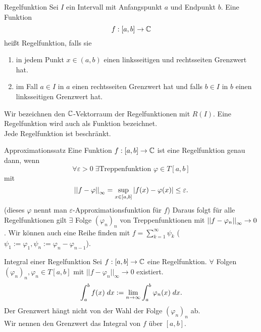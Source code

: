 \documentclass[main.tex]{subfiles}
\begin{document}
\begin{karte}{Regelfunktion}
    Sei \( I \) ein Intervall mit Anfangspunkt \(a\) 
    und Endpunkt \(b\). Eine Funktion 
    \[ \abb{f}{[a,b]}{\C} \] 
    heißt Regelfunktion, falls sie 
    \begin{enumerate}
        \item in jedem Punkt \(x \in (a,b)\) 
        einen linksseitigen und rechtsseiten 
        Grenzwert hat.
        
        \item im Fall \( a \in I \) in \(a\) einen 
        rechtsseiten Grenzwert hat und falls 
        \( b \in I \) in \(b\) 
        einen linksseitigen Grenzwert hat.
    \end{enumerate}
    Wir bezeichnen den \( \C \)-Vektorraum der 
    Regelfunktionen mit \( R(I) \).
    Eine Regelfunktion wird auch als  Funktion bezeichnet.\\
    Jede Regelfunktion ist beschränkt.
\end{karte}

\begin{karte}{Approximationssatz}
    Eine Funktion \( \abb{f}{[a,b]}{\C} \) ist 
    eine Regelfunktion genau dann, wenn 
    \[ \forall \varepsilon > 0 \; \exists 
    \text{Treppenfunktion } \varphi \in T[a,b] \]
    mit 
    \[ \norm{f - \varphi}_\infty 
    = \underset{x \in [a,b]}{\sup} \abs{f(x) - \varphi(x)}
    \leq \varepsilon. \]
    (dieses \(\varphi\) nennt man \( \varepsilon \)-Approximationsfunktion
    für \(f\))
    Daraus folgt für alle Regelfunktionen gilt 
    \( \exists \) Folge \( (\varphi_n)_n \) von Treppenfunktionen 
    mit \( \norm{f - \varphi_n}_\infty \rightarrow 0 \). 
    Wir können auch eine Reihe finden mit \( f = \sum_{k=1}^\infty \psi_k \) 
    (\( \psi_1 := \varphi_1, \psi_n := \varphi_n - \varphi_{n-1} \)).
\end{karte}

\begin{karte}{Integral einer Regelfunktion}
    Sei \( \abb{f}{[a,b]}{\C} \) eine Regelfunktion.
    \( \forall \) Folgen \( (\varphi_n)_n, \varphi_n \in T[a,b] \)
    mit \( ||f - \varphi_n||_\infty \rightarrow 0 \) existiert.
    \[ \integral{f(x)}{a}{b} 
    := \limes{n} \integral{\varphi_n(x)}{a}{b}. \]
    Der Grenzwert hängt nicht von der Wahl der Folge
    \( (\varphi_n)_n \) ab.\\
    Wir nennen den Grenzwert das Integral von 
    \( f \) über \( [a,b] \).
\end{karte}
\end{document}
